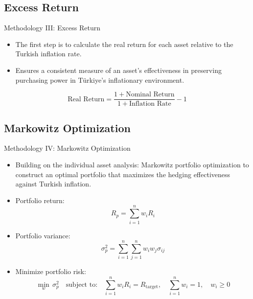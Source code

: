 \documentclass{beamer}
\begin{document}
\subsection{Excess Return}
\begin{frame}{Methodology III: Excess Return}

\begin{itemize}
\item The first step is to calculate the real return for each asset relative to the Turkish inflation rate. 
\item Ensures a consistent measure of an asset's effectiveness in preserving purchasing power in Türkiye's inflationary environment.
\end{itemize}

\[
\text{Real Return} = \frac{1 + \text{Nominal Return}}{1 + \text{Inflation Rate}} - 1
\]
\end{frame}

\subsection{Markowitz Optimization}
\begin{frame}{Methodology IV: Markowitz Optimization}
\begin{itemize}
\item Building on the individual asset analysis: Markowitz portfolio optimization to construct an optimal portfolio that maximizes the hedging effectiveness against Turkish inflation.
\item Portfolio return: \[
R_p = \sum_{i=1}^{n} w_i R_i
\]
\item Portfolio variance: \[
\sigma_p^2 = \sum_{i=1}^{n} \sum_{j=1}^{n} w_i w_j \sigma_{ij}
\]
\item Minimize portfolio risk: \[
\min_{w} \, \sigma_p^2 \quad \text{subject to:} \quad \sum_{i=1}^{n} w_i R_i = R_{\text{target}}, \quad \sum_{i=1}^{n} w_i = 1, \quad w_i \geq 0
\]
\end{itemize}
\end{frame}

\end{document}
